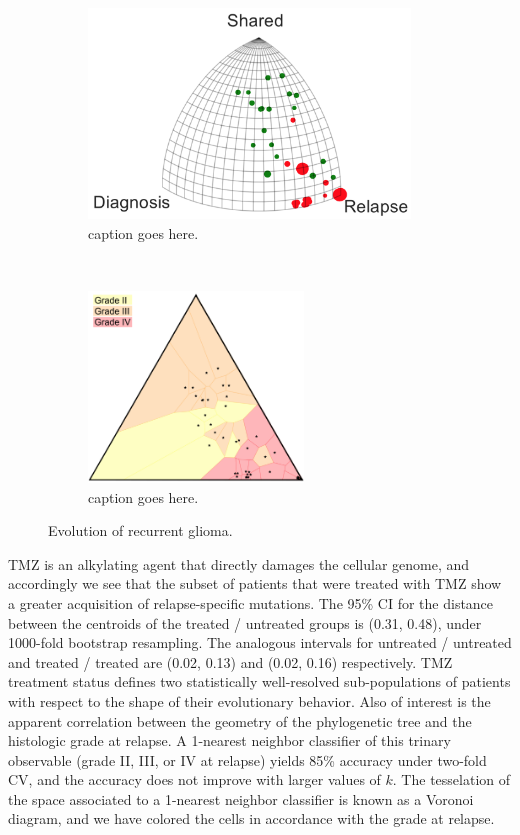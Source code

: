 \documentclass[a4paper,11pt]{article}
\begin{document}
\begin{figure}
    \begin{subfigure}{0.5\linewidth}
    \centering
    \includegraphics[height=2.2in]{figures/glioma_triplet.png}
    \caption{caption goes here.}
    \end{subfigure}
    ~
    \begin{subfigure}{0.5\linewidth}
    \centering
    \includegraphics[height=2in]{figures/glioma_voronoi_stage.png}
    \caption{caption goes here.}
    \end{subfigure}

    \caption{Evolution of recurrent glioma.}
    \label{fig:gliomaTMZ}
\end{figure}

TMZ is an alkylating agent that directly damages the cellular genome, and accordingly we see that the subset of patients that were treated with TMZ show a greater acquisition of relapse-specific mutations.
The 95\% CI for the distance between the centroids of the treated / untreated groups is (0.31, 0.48), under 1000-fold bootstrap resampling.
The analogous intervals for untreated / untreated and treated / treated are (0.02, 0.13) and (0.02, 0.16) respectively.
TMZ treatment status defines two statistically well-resolved sub-populations of patients with respect to the shape of their evolutionary behavior.
Also of interest is the apparent correlation between the geometry of the phylogenetic tree and the histologic grade at relapse.
A 1-nearest neighbor classifier of this trinary observable (grade II, III, or IV at relapse) yields 85\% accuracy under two-fold CV, and the accuracy does not improve with larger values of $k$.
The tesselation of the space associated to a 1-nearest neighbor classifier is known as a Voronoi diagram, and we have colored the cells in accordance with the grade at relapse.
\end{document}
